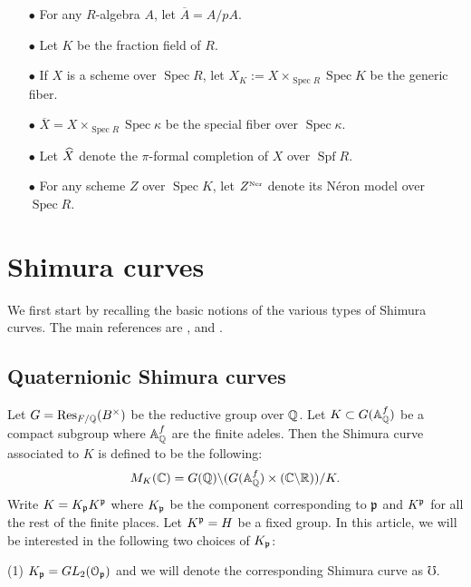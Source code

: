 \documentclass{amsart}
\numberwithin{equation}{section}
\def \mb{\mbox}
\newcommand{\ner}{\mb{\tiny Ner}}
\DeclareMathOperator{\Spec}{\mathrm{Spec}}
\DeclareMathOperator{\Spf}{\mathrm{Spf}}
\newcommand{\Res}{\mb{Res}}
\newcommand{\obar}[1]{\overline{#1}}
\begin{document}
\begin{enumerate}
\item[$\bullet$] For any $R$-algebra $A$, let $\overline{A}= A/pA$.

\item[$\bullet$] Let $K$ be the fraction field of $R$.

\item[$\bullet$] 
If  $X$ is a scheme over $\Spec R$, let $X_K:= X \times_{\Spec R} \Spec K$ be 
the generic fiber.  

\item[$\bullet$] $\obar{X}= X \times_{\Spec R} \Spec \kappa$ be the special 
fiber over $\Spec \kappa$.

\item[$\bullet$] 
Let $\widehat{X}$ denote the $\pi$-formal completion of $X$ over $\Spf R$.

\item[$\bullet$]
For any scheme $Z$ over $\Spec K$, let $Z^{\ner}$
denote its N\'{e}ron model over $\Spec R$. 

\end{enumerate}

\section{Shimura curves}
\label{quaternionas}

We first start by recalling the basic notions of the various types of Shimura 
curves. The main references are \cite{MR860139}, \cite{MR2357747} and 
\cite{MR2027194}.

\subsection{Quaternionic Shimura curves}
Let $G= \Res_{F/\Q}(B^\times)$ be the reductive group over $\mathbb{Q}$. Let $K \subset
G(\mathbb{A}_{\mathbb{Q}}^f)$ be a compact subgroup where $\mathbb{A}^f_{\mathbb{Q}}$ are 
the finite adeles. Then the Shimura curve associated to $K$ is defined to be
the following:
\begin{align}
\label{Shim1}
M_K(\mathbb{C}) = G(\mathbb{Q}) \backslash (G(\mathbb{A}^f_{\mathbb{Q}}) \times (\mathbb{C} \backslash \mathbb{R}))/K.
\end{align}
Write $K= K_{\mathfrak{p}} K^{\mathfrak{p}}$ where $K_{\mathfrak{p}}$ be the component corresponding to 
$\mathfrak{p}$ and $K^{\mathfrak{p}}$ for all the rest of the finite places. Let $K^{\mathfrak{p}}= H$ be a
fixed group.
In this article, we will be interested in the following two choices of $K_{\mathfrak{p}}$: 

(1) $K_{\mathfrak{p}} = GL_2(\mathcal{O}_{\mathfrak{p}})$ and we will denote the corresponding 
Shimura curve as $\Mho$.
\end{document}
